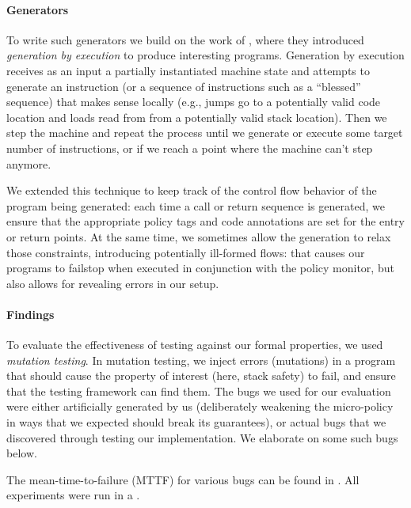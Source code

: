 \documentclass[acmsmall,review,anonymous]{acmart}\settopmatter{printfolios=true,printccs=false,printacmref=false}
\begin{document}
\paragraph*{Generators}

To write such generators we build on the work of ,
where they introduced {\em generation by execution} to produce
interesting programs. Generation by execution receives as an input a
partially instantiated machine state and attempts to generate an
instruction (or a sequence of instructions such as a ``blessed''
sequence) that makes sense locally (e.g., jumps go to a potentially valid
code location and loads read from from a potentially valid stack
location). Then
we step the machine and repeat the process until we generate or
execute some target number of instructions, or if we reach a point
where the machine can't step anymore.

We extended this technique to keep track of the control flow behavior of
the program being generated: each time a call or return sequence is
generated, we ensure that the appropriate policy tags and code
annotations are set for the entry or return points. At the same time,
we sometimes allow the generation to relax those constraints,
introducing potentially ill-formed flows: that causes our programs
to failstop when executed in conjunction with the policy monitor,
but also allows for revealing errors in our setup.

\paragraph*{Findings}

To evaluate the effectiveness of testing against our formal properties, we
used {\em mutation testing}. In mutation testing, we inject errors
(mutations) in a program that should cause the property of interest (here,
stack safety) to fail, and ensure that the testing framework can find
them. The bugs we used for our evaluation were either artificially generated
by us (deliberately weakening the micro-policy in ways that we expected
should break its guarantees), or actual bugs that we discovered through
testing our implementation. We elaborate on some such bugs below.

The mean-time-to-failure (MTTF) for various bugs can be found in . All experiments were run in a . 
\end{document}
